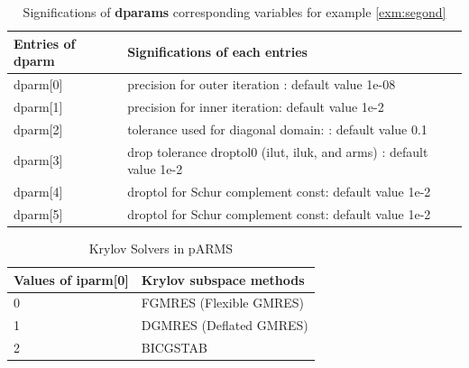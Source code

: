 \documentclass[a4paper,twoside,12pt]{book}
\begin{document}
\begin{table}[hbtp]
\begin{center}
\begin{tabular}{|l|l|} \hline
\textbf{Entries of dparm} & \textbf{Significations of each entries} \\ \hline
dparm[0] & precision for outer iteration : default value 1e-08\\ \hline
dparm[1] & precision for inner iteration:  default value 1e-2\\ \hline
dparm[2] & tolerance used for diagonal domain: : default value 0.1\\ \hline
dparm[3] & drop tolerance droptol0 (ilut, iluk, and arms) : default value 1e-2\\
\hline
dparm[4] & droptol for Schur complement const: default value 1e-2\\ \hline
dparm[5] & droptol for Schur complement const: default value 1e-2 \\ \hline
\end{tabular}
\end{center}
\caption{Significations of \textbf{dparams} corresponding variables for  example
\ref{exm:segond} }
\label{pardoubleparm}
\end{table}

\begin{table}[hbtp]
\begin{center}
 \begin{tabular}{|l|l|} \hline
Values of iparm[0] & Krylov subspace methods \\ \hline
0   &	FGMRES (Flexible GMRES) \\ \hline
1   &   DGMRES (Deflated GMRES) \\ \hline
2   &   BICGSTAB \\ \hline
 \end{tabular}
\end{center}
\caption{Krylov Solvers in pARMS}
\label{kryparms}
\end{table}
\end{document}
